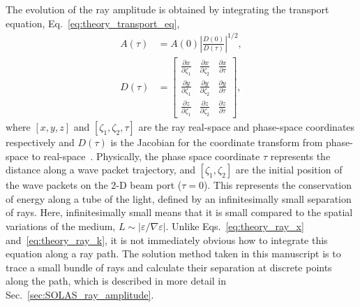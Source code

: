 The evolution of the ray amplitude is obtained by integrating the transport equation, Eq.~\ref{eq:theory_transport_eq},
\begin{align}
    \label{eq:theory_ray_amp}
    A(\tau) &= A(0)\left| \frac{D(0)}{D(\tau)} \right|^{1/2}, \\
    D(\tau) &= 
    \begin{bmatrix}
        \frac{\partial x}{\partial \zeta_1} & \frac{\partial x}{\partial \zeta_2} & \frac{\partial x}{\partial \tau} \\
        \frac{\partial y}{\partial \zeta_1} & \frac{\partial y}{\partial \zeta_2} & \frac{\partial y}{\partial \tau} \\
        \frac{\partial z}{\partial \zeta_1} & \frac{\partial z}{\partial \zeta_2} & \frac{\partial z}{\partial \tau}
    \end{bmatrix},
\end{align}
where $[x,y,z]$ and $[\zeta_1,\zeta_2,\tau]$ are the ray real-space and phase-space coordinates respectively and $D(\tau)$ is the Jacobian for the coordinate transform from phase-space to real-space~\cite{colaitis_inverse_2021}.
Physically, the phase space coordinate $\tau$ represents the distance along a wave packet trajectory, and $[\zeta_1,\zeta_2]$ are the initial position of the wave packets on the 2-D beam port ($\tau=0$).
This represents the conservation of energy along a tube of the light, defined by an infinitesimally small separation of rays.
Here, infinitesimally small means that it is small compared to the spatial variations of the medium, $L\sim|\varepsilon/\nabla \varepsilon|$.
Unlike Eqs.~\ref{eq:theory_ray_x} and~\ref{eq:theory_ray_k}, it is not immediately obvious how to integrate this equation along a ray path.
The solution method taken in this manuscript is to trace a small bundle of rays and calculate their separation at discrete points along the path, which is described in more detail in Sec.~\ref{sec:SOLAS_ray_amplitude}.

